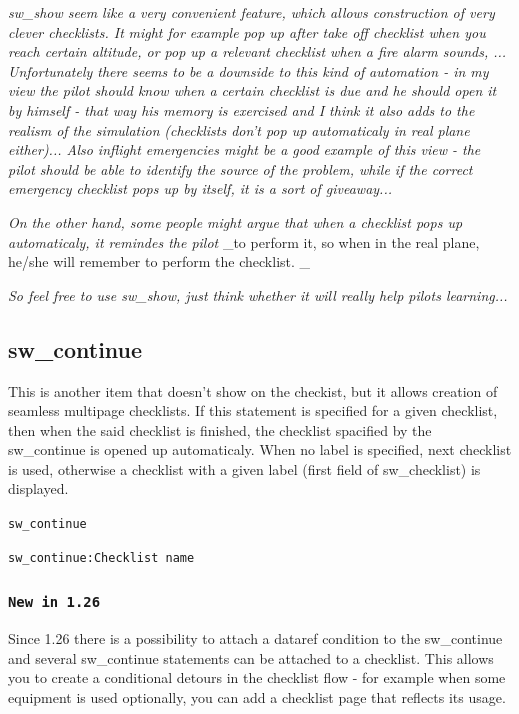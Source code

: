 \documentclass[11pt,parskip=half,a4paper]{scrartcl}
\newcommand\textstyleSourceText[1]{\texttt{#1}}
\newcommand\textstyleEmphasis[1]{\textit{#1}}
\begin{document}
\textstyleEmphasis{sw\_show seem like a very convenient feature, which allows construction of very clever checklists. It} \textstyleEmphasis{might for example pop up after take off checklist when you reach certain altitude, or pop up a relevant} \textstyleEmphasis{checklist when a fire alarm sounds, ... Unfortunately there seems to be a downside to this kind of} \textstyleEmphasis{automation - in my view the pilot should know when a certain checklist is due and he should open it} \textstyleEmphasis{by himself - that way his memory is exercised and I think it also adds to the realism of the simulation} \textstyleEmphasis{(checklists don't pop up automaticaly in real plane either)... Also inflight emergencies might be a good} \textstyleEmphasis{example of this view - the pilot should be able to identify the source of the problem, while if the correct} \textstyleEmphasis{emergency checklist pops up by itself, it is a sort of
giveaway...}

\textstyleEmphasis{On the other hand, some people might argue that when a checklist pops up automaticaly, it remindes the pilot} \_to perform it, so when in the real plane, he/she will remember to perform the checklist. \_

\textstyleEmphasis{So feel free to use sw\_show, just think whether it will really help pilots learning...}


\subsection[sw\_continue]{sw\_continue}
This is another item that doesn't show on the checkist, but it allows creation of {\textquotedbl}seamless{\textquotedbl}
multipage checklists. If this statement is specified for a given checklist, then when the said checklist is finished, the checklist spacified by the sw\_continue is opened up automaticaly. When no label is specified, next checklist is used, otherwise a checklist with a given label (first field of sw\_checklist) is displayed.

\textstyleSourceText{sw\_continue}

\textstyleSourceText{sw\_continue:Checklist name}

\subsubsection[New in 1.26]{\textstyleSourceText{New in 1.26}}
Since 1.26 there is a possibility to attach a dataref condition to the sw\_continue and several sw\_continue statements can be attached to a checklist. This allows you to create a conditional {\textquotedbl}detours{\textquotedbl} in the checklist flow - for example when some equipment is used optionally, you can add a checklist page that reflects its usage.
\end{document}
